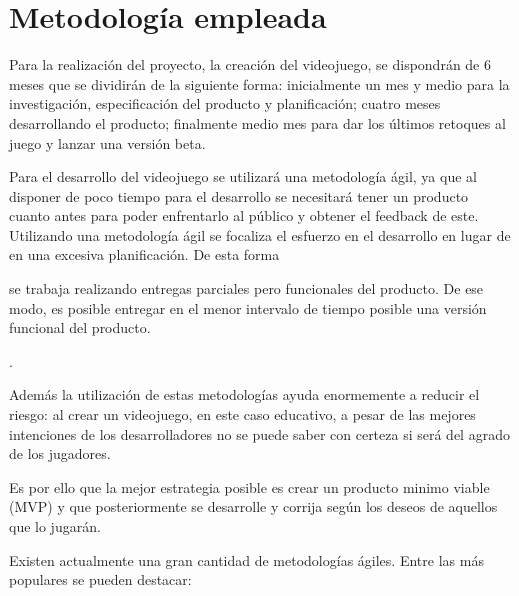 \chapter{Metodología empleada}

Para la realización del proyecto, la creación del videojuego, se dispondrán de 6 meses que se dividirán de la siguiente forma: inicialmente un mes y medio para la investigación, especificación del producto y planificación; cuatro meses desarrollando el producto; finalmente medio mes para dar los últimos retoques al juego y lanzar una versión beta.

Para el desarrollo del videojuego se utilizará una metodología ágil, ya que al disponer de poco tiempo para el desarrollo se necesitará tener un producto cuanto antes para poder enfrentarlo al público y obtener el feedback de este. Utilizando una metodología ágil se focaliza el esfuerzo en el desarrollo en lugar de en una excesiva planificación. De esta forma 
\begin{itquote}
	se trabaja realizando entregas parciales pero funcionales del producto. De ese modo, es posible entregar en el menor intervalo de tiempo posible una versión funcional del producto.
	\begin{flushright}
	 	\cite{eduardomartinez2014}.
 	\end{flushright}
\end{itquote}

Además la utilización de estas metodologías ayuda enormemente a reducir el riesgo: al crear un videojuego, en este caso educativo, a pesar de las mejores intenciones de los desarrolladores no se puede saber con certeza si será del agrado de los jugadores.

Es por ello que la mejor estrategia posible es crear un producto minimo viable (MVP) y que posteriormente se desarrolle y corrija según los deseos de aquellos que lo jugarán. 

Existen actualmente una gran cantidad de metodologías ágiles. Entre las más populares se pueden destacar: 

